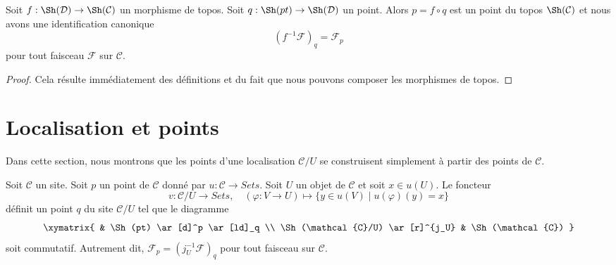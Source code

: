 \begin{lemma}
\label{lemma-point-morphism-topoi}
Soit $f : \Sh(\mathcal{D}) \to \Sh(\mathcal{C})$
un morphisme de topos. Soit $q : \Sh(pt) \to \Sh(\mathcal{D})$
un point. Alors $p = f \circ q$ est un point du topos
$\Sh(\mathcal{C})$ et nous avons
une identification canonique
$$
(f^{-1}\mathcal{F})_q = \mathcal{F}_p
$$
pour tout faisceau $\mathcal{F}$ sur $\mathcal{C}$.
\end{lemma}

\begin{proof}
Cela résulte immédiatement des définitions et du fait que nous pouvons
composer les morphismes de topos.
\end{proof}





\section{Localisation et points}
\label{section-localize-points}

\noindent
Dans cette section, nous montrons que les points d’une localisation $\mathcal{C}/U$
se construisent simplement à partir des points de $\mathcal{C}$.

\begin{lemma}
\label{lemma-point-localize}
Soit $\mathcal{C}$ un site. Soit $p$ un point de $\mathcal{C}$ donné par
$u : \mathcal{C} \to \textit{Sets}$. Soit $U$ un objet de $\mathcal{C}$
et soit $x \in u(U)$. Le foncteur
$$
v : \mathcal{C}/U \longrightarrow \textit{Sets}, \quad
(\varphi : V \to U) \longmapsto \{y \in u(V) \mid u(\varphi)(y) = x\}
$$
définit un point $q$ du site $\mathcal{C}/U$ tel que le diagramme
$$
\xymatrix{
& \Sh(pt) \ar[d]^p \ar[ld]_q \\
\Sh(\mathcal{C}/U) \ar[r]^{j_U} &
\Sh(\mathcal{C})
}
$$
soit commutatif. Autrement dit,
$\mathcal{F}_p = (j_U^{-1}\mathcal{F})_q$ pour tout
faisceau sur $\mathcal{C}$.
\end{lemma}

